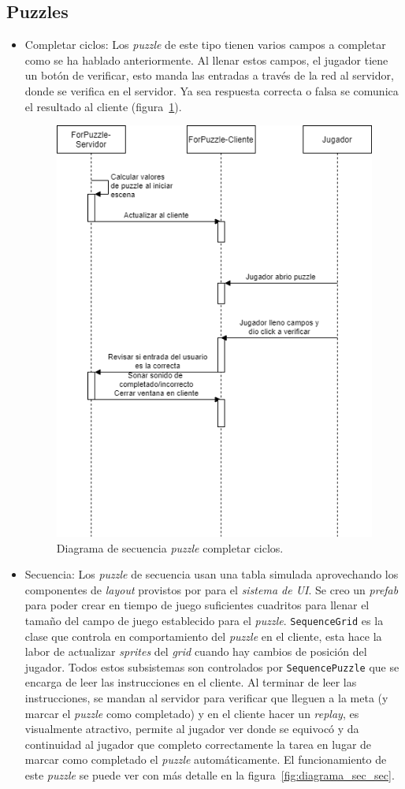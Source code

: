 \subsection{Puzzles}
\begin{itemize}
    \item Completar ciclos: Los \textit{puzzle} de este tipo tienen varios campos a completar como se ha hablado anteriormente. Al llenar estos campos, el jugador tiene un botón de verificar, esto manda las entradas a través de la red al servidor, donde se verifica en el servidor. Ya sea respuesta correcta o falsa se comunica el resultado al cliente (figura~\ref{fig:diagrama_sec_for_while}).
    \begin{figure}[H]
        \centering
        \includegraphics[width=0.4\linewidth]{images/diagrama_sec_for_while.png}
        \caption{Diagrama de secuencia \textit{puzzle} completar ciclos.}
        \label{fig:diagrama_sec_for_while}
    \end{figure}
    \item Secuencia: Los \textit{puzzle} de secuencia usan una tabla simulada aprovechando los componentes de \textit{layout} provistos por  para el \textit{sistema de UI}. Se creo un \textit{prefab} para poder crear en tiempo de juego suficientes cuadritos para llenar el tamaño del campo de juego establecido para el \textit{puzzle}. \texttt{SequenceGrid} es la clase que controla en comportamiento del \textit{puzzle} en el cliente, esta hace la labor de actualizar \textit{sprites} del \textit{grid} cuando hay cambios de posición del jugador. Todos estos subsistemas son controlados por \texttt{SequencePuzzle} que se encarga de leer las instrucciones en el cliente. Al terminar de leer las instrucciones, se mandan al servidor para verificar que lleguen a la meta (y marcar el \textit{puzzle} como completado) y en el cliente hacer un \textit{replay}, es visualmente atractivo, permite al jugador ver donde se equivocó y da continuidad al jugador que completo correctamente la tarea en lugar de marcar como completado el \textit{puzzle} automáticamente. El funcionamiento de este \textit{puzzle} se puede ver con más detalle en la figura~\ref{fig:diagrama_sec_sec}.

\end{itemize}
